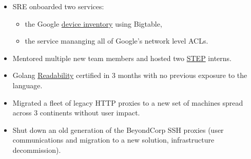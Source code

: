 \documentclass[a4paper,sans,colorlinks]{moderncv}
\begin{document}
{\begin{itemize}
\begin{itemize}
\href{https://www.usenix.org/publications/login/fall2017/escobedo}{article}.
\end{itemize}
\item SRE onboarded two services:
\begin{itemize}
\item
the Google
\href{https://storage.googleapis.com/pub-tools-public-publication-data/pdf/44860.pdf}{device inventory}
using Bigtable,
\item the service mananging all of Google's network level ACLs.
\end{itemize}
\item Mentored multiple new team members and hosted two
\href{https://careers.google.com/students/engineering-and-technical-internships/}{STEP} interns.
\item
Golang \href{https://sback.it/publications/icse2018seip.pdf}{Readability}
certified in 3 months with no previous exposure to the language.
\item
 Migrated a fleet of legacy HTTP proxies to a new set of machines
spread across 3 continents without user impact.
\item
Shut down an old generation of the BeyondCorp SSH proxies (user communications
and migration to a new solution, infrastructure decommission).
\end{itemize}
}
\end{document}
